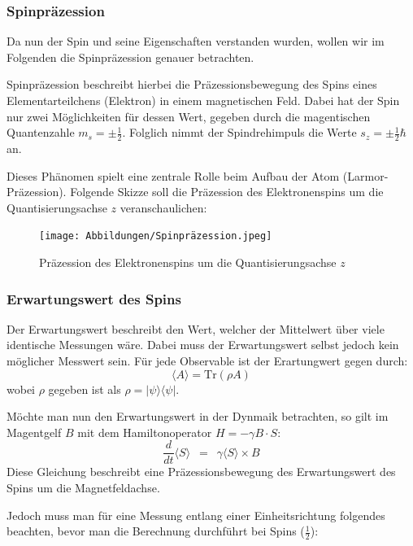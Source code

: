 \documentclass{article}
\newcommand{\widespace}{\enspace}
\newcommand{\wideeq}{\widespace = \widespace}
\begin{document}
\subsubsection{Spinpräzession}

\cite{sdw}

\cite{tech}

Da nun der Spin und seine Eigenschaften verstanden wurden, wollen wir im Folgenden die Spinpräzession genauer betrachten.

Spinpräzession beschreibt hierbei die Präzessionsbewegung des Spins eines Elementarteilchens (Elektron) in einem magnetischen Feld. Dabei hat der Spin nur zwei Möglichkeiten für dessen Wert, gegeben durch die magentischen Quantenzahle $m_s=\pm\frac{1}{2}$. Folglich nimmt der Spindrehimpuls die Werte $s_z=\pm\frac{1}{2}\hbar$ an.

Dieses Phänomen spielt eine zentrale Rolle beim Aufbau der Atom (Larmor-Präzession). Folgende Skizze soll die Präzession des Elektronenspins um die Quantisierungsachse $z$ veranschaulichen:

\begin{figure}[H]
    \centering
    \texttt{[image: Abbildungen/Spinpräzession.jpeg]}
    \caption{Präzession des Elektronenspins um die Quantisierungsachse $z$}
\end{figure}

\subsubsection{Erwartungswert des Spins}

\cite{dm}

\cite{tss}

Der Erwartungswert beschreibt den Wert, welcher der Mittelwert über viele identische Messungen wäre. Dabei muss der Erwartungswert selbst jedoch kein möglicher Messwert sein. Für jede Observable ist der Erartungwert gegen durch: 
\[
    \langle A \rangle = \text{Tr}(\rho A)
\]
wobei $\rho$ gegeben ist als $\rho = | \psi \rangle \langle \psi |$.

Möchte man nun den Erwartungswert in der Dynmaik betrachten, so gilt im Magentgelf $B$ mit dem Hamiltonoperator $H=-\gamma B \cdot S$:
\[
    \frac{d}{dt} \langle S \rangle \wideeq \gamma \langle S \rangle \times B
\]
Diese Gleichung beschreibt eine Präzessionsbewegung des Erwartungswert des Spins um die Magnetfeldachse.

Jedoch muss man für eine Messung entlang einer Einheitsrichtung folgendes beachten, bevor man die Berechnung durchführt bei Spins ($\frac{1}{2}$):
\end{document}
